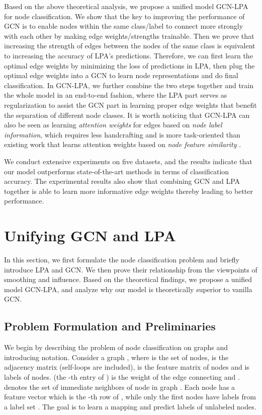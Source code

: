 \documentclass{article}
\begin{document}
	Based on the above theoretical analysis, we propose a unified model GCN-LPA for node classification.
	We show that the key to improving the performance of GCN is to enable nodes within the same class/label to connect more strongly with each other by making edge weights/strengths trainable.
	Then we prove that increasing the strength of edges between the nodes of the same class is equivalent to increasing the accuracy of LPA's predictions.
	Therefore, we can first learn the optimal edge weights by minimizing the loss of predictions in LPA, then plug the optimal edge weights into a GCN to learn node representations and do final classification.
	In GCN-LPA, we further combine the two steps together and train the whole model in an end-to-end fashion, where the LPA part serves as regularization to assist the GCN part in learning proper edge weights that benefit the separation of different node classes.
	It is worth noticing that GCN-LPA can also be seen as learning \textit{attention weights} for edges based on \textit{node label information}, which requires less handcrafting and is more task-oriented than existing work that learns attention weights based on \textit{node feature similarity} \citep{velivckovic2018graph,thekumparampil2018attention,zhang2018gaan,liu2019geniepath}.
	
	We conduct extensive experiments on five datasets, and the results indicate that our model outperforms state-of-the-art methods in terms of classification accuracy.
	The experimental results also show that combining GCN and LPA together is able to learn more informative edge weights thereby leading to better performance.
	
	
	
\section{Unifying GCN and LPA}
    In this section, we first formulate the node classification problem and briefly introduce LPA and GCN.
    We then prove their relationship from the viewpoints of smoothing and influence.
    Based on the theoretical findings, we propose a unified model GCN-LPA, and analyze why our model is theoretically superior to vanilla GCN.
    
	\subsection{Problem Formulation and Preliminaries}
		We begin by describing the problem of node classification on graphs and introducing notation.
		Consider a graph , where  is the set of nodes,  is the adjacency matrix (self-loops are included),  is the feature matrix of nodes and  is labels of nodes.
		 (the -th entry of ) is the weight of the edge connecting  and .
		 denotes the set of immediate neighbors of node  in graph .
		Each node  has a feature vector  which is the -th row of , while only the first  nodes have labels  from a label set .
		The goal is to learn a mapping  and predict labels of unlabeled nodes.
	
\end{document}
